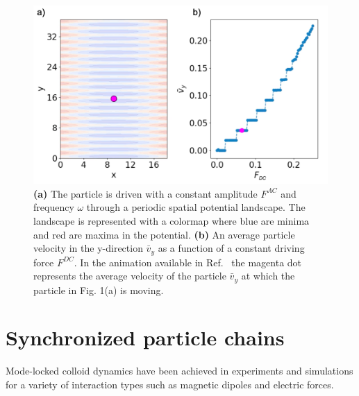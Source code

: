 \documentclass[twocolumn,preprintnumbers,amsmath,amssymb,aps,prx]{revtex4}
\begin{document}
\begin{center}
\begin{figure}[h!]
\centering
\includegraphics[width=\columnwidth]{single}
\caption{\textbf{(a)} The particle is driven with a constant amplitude $F^{AC}$ and frequency $\omega$ through a periodic spatial potential landscape.  The landscape is represented with a colormap where blue are minima and red are maxima in the potential. \textbf{(b)} An average particle velocity in the y-direction $\bar{v}_{y}$ as a function of a constant driving force $F^{DC}$. In the animation available in Ref.~\cite{supp1} the magenta dot represents the average velocity of the particle $\bar{v}_{y}$ at which the particle in Fig. 1(a) is moving.}
\label{fig:1}
\end{figure}
\end{center}

\section{Synchronized particle chains}
\label{sec:sync}

Mode-locked 
colloid dynamics have been achieved in 
experiments \cite{Juniper2015, Lutz2004} and
simulations \cite{Herrera-Velarde2007, Herrera-Velarde2008} 
for a variety of interaction types such as 
magnetic dipoles and electric forces.
\end{document}
